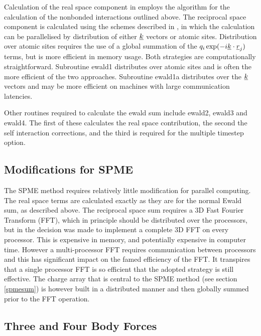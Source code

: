 Calculation of the real space component in \D{} employs the algorithm
for the calculation of the nonbonded interactions outlined above. The
reciprocal space component is calculated using the schemes described
in \cite{smith-92b}, in which the calculation can be
parallelised by
distribution of either $\mbox{$\underline{k}$}$ vectors or atomic sites. Distribution
over atomic sites requires the use of a global summation of the
$q_{i}\exp(-i\mbox{$\underline{k}$}\cdot\mbox{$\underline{r}$}_{j})$ terms, but is more efficient in
memory usage. Both strategies are computationally straightforward.
Subroutine {\sc ewald1} distributes over atomic sites and is often the
more efficient of the two approaches. Subroutine {\sc ewald1a}
distributes over the $\mbox{$\underline{k}$}$ vectors and may be more efficient on
machines with large communication latencies.

Other routines required to calculate the ewald sum include {\sc
ewald2}, {\sc ewald3} and {\sc ewald4}. The first of these calculates
the real space contribution, the second the self interaction
corrections, and the third is required for the multiple timestep
option.

\subsection{Modifications for SPME}

The SPME method requires
relatively little modification for parallel computing. The real space
terms are calculated exactly as they are for the normal Ewald sum, as
described above. The reciprocal space sum requires a 3D Fast Fourier
Transform (FFT), which in principle should be distributed over the
processors, but in \D{} the decision was made to implement a complete 3D
FFT on every processor. This is expensive in memory, and potentially
expensive in computer time. However a multi-processor FFT requires
communication between processors and this has significant impact on
the famed efficiency of the FFT. It transpires that a single processor
FFT is so efficient that the adopted strategy is still effective. The
charge array that is central to the SPME method (see section
\ref{spmesum}) is however built in a distributed manner and then
globally summed prior to the FFT operation.

\subsection{Three and Four Body Forces}

